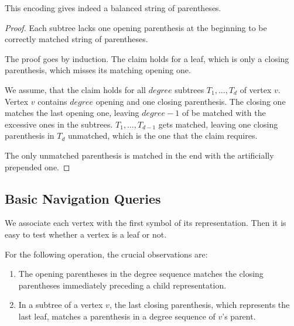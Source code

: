 \begin{lemma}
	This encoding gives indeed a balanced string of parentheses.
\end{lemma}
\begin{proof}
	Each subtree lacks one opening parenthesis at the beginning to be correctly matched string of parentheses.
	
	The proof goes by induction.
	The claim holds for a leaf, which is only a closing parenthesis, which misses its matching opening one.
	
	We assume, that the claim holds for all $degree$ subtrees $T_1, \ldots, T_d$ of vertex $v$.
	Vertex $v$ contains $degree$ opening and one closing parenthesis.
	The closing one matches the last opening one, leaving $degree - 1$ of be matched with the excessive ones in the subtrees.
	$T_1, \ldots, T_{d-1}$ gets matched, leaving one closing parenthesis in $T_d$ unmatched, which is the one that the claim requires.
	
	The only unmatched parenthesis is matched in the end with the artificially prepended one.
\end{proof}

\subsection{Basic Navigation Queries}

We associate each vertex with the first symbol of its representation.
Then it is easy to test whether a vertex is a leaf or not.

\begin{algorithmic}
	\State {}
\EndFunction
\end{algorithmic}

\begin{algorithmic}
	\State {} 
\EndFunction
\end{algorithmic}

For the following operation, the crucial observations are:
\begin{enumerate}
	\item The opening parentheses in the degree sequence matches the closing parentheses immediately preceding a child representation.
	\item In a subtree of a vertex $v$, the last closing parenthesis, which represents the last leaf, matches a parenthesis in a degree sequence of $v$'s parent.
\end{enumerate}

